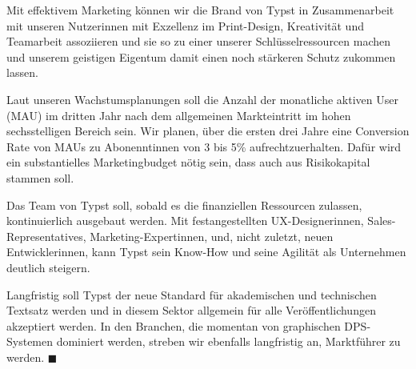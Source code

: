 \documentclass[11pt, a4paper]{article}
\newcommand{\gender}{\raisebox{-.25em}{*}}
\begin{document}
Mit effektivem Marketing können wir die Brand von Typst in Zusammenarbeit mit unseren Nutzer\gender{}innen mit Exzellenz im Print-Design, Kreativität und Teamarbeit assoziieren und sie so zu einer unserer Schlüsselressourcen machen und unserem geistigen Eigentum damit einen noch stärkeren Schutz zukommen lassen.

Laut unseren Wachstumsplanungen soll die Anzahl der monatliche aktiven User (MAU) im dritten Jahr nach dem allgemeinen Markteintritt im hohen sechsstelligen Bereich sein. Wir planen, über die ersten drei Jahre eine Conversion Rate von MAUs zu Abonennt\gender{}innen von 3 bis 5\% aufrechtzuerhalten. Dafür wird ein substantielles Marketingbudget nötig sein, dass auch aus Risikokapital stammen soll.

Das Team von Typst soll, sobald es die finanziellen Ressourcen zulassen, kontinuierlich ausgebaut werden. Mit festangestellten UX-Designer\gender{}innen, Sales-Representatives, Marketing-Expert\gender{}innen, und, nicht zuletzt, neuen Entwickler\gender{}innen, kann Typst sein Know-How und seine Agilität als Unternehmen deutlich steigern.

Langfristig soll Typst der neue Standard für akademischen und technischen Textsatz werden und in diesem Sektor allgemein für alle Veröffentlichungen akzeptiert werden. In den Branchen, die momentan von graphischen DPS-Systemen dominiert werden, streben wir ebenfalls langfristig an, Marktführer zu werden. \hfill {\color{eastern} $\blacksquare$}
\end{document}
